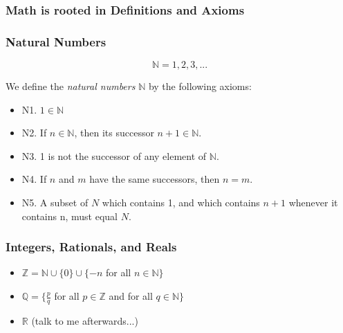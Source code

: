 \documentclass[10pt]{beamer}
\def\R{\mathbb{R}}                     %
\def\N{\mathbb{N}}                     %
\def\Z{\mathbb{Z}}                     %
\def\Q{\mathbb{Q}}                     %
\begin{document}
\begin{frame}
  \frametitle{Math is rooted in Definitions and Axioms}
\end{frame}

\begin{frame}
  \frametitle{Natural Numbers}

  \[ \N = {1, 2, 3, ...} \]

  \pause

  We define the \textit{natural numbers} $\N$ by the following axioms:

  \begin{itemize}
  \item N1. $1 \in \N$
  \item N2. If $n \in \N$, then its successor $n + 1 \in \N$.
  \item N3. 1 is not the successor of any element of $\N$.
  \item N4. If $n$ and $m$ have the same successors, then $n = m$.
  \item N5. A subset of $N$ which contains 1, and which contains $n + 1$ whenever it contains n, must equal $N$.
  \end{itemize}
\end{frame}

\begin{frame}
  \frametitle{Integers, Rationals, and Reals}

  \begin{itemize}
  \item $\Z = \N \cup \{0\} \cup \{ -n $ for all $n \in \N \}$
  \item $\Q = \{ \frac{p}{q} $ for all $p \in \Z$ and for all $q \in \N \}$
  \item $\R$ (talk to me afterwards...)
  \end{itemize}
\end{frame}
\end{document}

